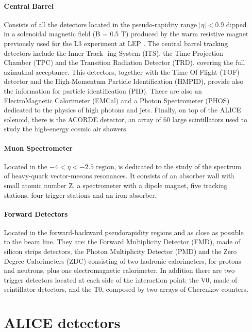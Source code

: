 \paragraph{Central Barrel}
Consists of all the detectors located in the pseudo-rapidity range $|\eta| < 0.9$ dipped in a 
solenoidal magnetic field (B = 0.5 T) produced by the warm resistive magnet previously used for
the L3 experiment at LEP \cite{lep}.
The central barrel  tracking detectors include the Inner Track- ing System (ITS), the Time Projection 
Chamber (TPC) and the Transition Radiation Detector (TRD), covering the full azimuthal acceptance.
This detectors, together with the Time Of Flight (TOF) detector and the High-Momentum 
Particle Identification (HMPID), provide also the information for particle identification (PID).
There are also an ElectroMagnetic Calorimeter (EMCal) and a Photon Spectrometer (PHOS) dedicated to the
physics of high \pt photons and jets.
Finally, on top of the ALICE solenoid, there is the ACORDE detector, an array of 60 large scintillators
used to study the high-energy cosmic air showers.

\paragraph{Muon Spectrometer} 
Located in the $-4 < \eta < -2.5$ region, is dedicated to the study of the spectrum of 
heavy-quark vector-mesons resonances.
It consists of an absorber wall with small atomic number Z, a spectrometer with a dipole magnet,
five tracking stations, four trigger stations and an iron absorber.

\paragraph{Forward Detectors}
Located in the forward-backward pseudorapidity regions and as close as possible to the beam line.
They are: the Forward Multiplicity Detector (FMD), made of silicon strips detectors, the Photon
Multiplicity Detector (PMD) and the Zero Degree Calorimeters (ZDC) consisting of two hadronic 
calorimeters, for protons and neutrons, plus one electromagnetic calorimeter. 
In addition there are two trigger detectors located at each side of the interaction point:
the V0, made of scintillator detectors, and the T0, composed by two arrays of Cherenkov counters.

%
%
\section{ALICE detectors} \label{sec:alice_detectors}

